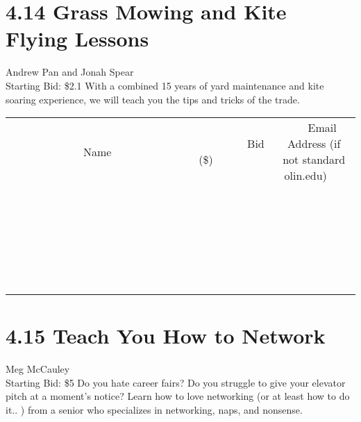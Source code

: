 \documentclass[11pt]{article}
\begin{document}
\section*{4.14 Grass Mowing and Kite Flying Lessons}
Andrew Pan and Jonah Spear
\\
Starting Bid: \$2.1
\newline
With a combined 15 years of yard maintenance and kite soaring experience, we will teach you the tips and tricks of the trade.
\\[6ex]
\begin{tabular}{c c c}
~~~~~~~~~~~~~Name~~~~~~~~~~~~~ & ~~~~~~~~~Bid (\$)~~~~~~~~~  & ~~~Email Address (if not standard olin.edu)~~~\\
 & & \\
\hline
 & & \\
\hline
 & & \\
\hline
 & & \\
\hline
 & & \\
\hline
 & & \\
\hline
 & & \\
\hline
 & & \\
\hline
 & & \\
\hline
 & & \\
\hline
 & & \\
\hline
 & & \\
\hline
 & & \\
\hline
 & & \\
\hline
 & & \\
\hline
 & & \\
\hline
 & & \\
\hline
 & & \\
\hline
 & & \\
\hline
 & & \\
\hline
 & & \\
\hline
 & & \\
\hline
 & & \\
\hline
 & & \\
\hline
 & & \\
\hline
 & & \\
\hline
\end{tabular}
\newpage
\section*{4.15 Teach You How to Network }
Meg McCauley 
\\
Starting Bid: \$5
\newline
Do you hate career fairs? Do you struggle to give your elevator pitch at a moment's notice? Learn how to love networking (or at least how to do it.. ) from a senior who specializes in networking, naps, and nonsense.
\end{document}
